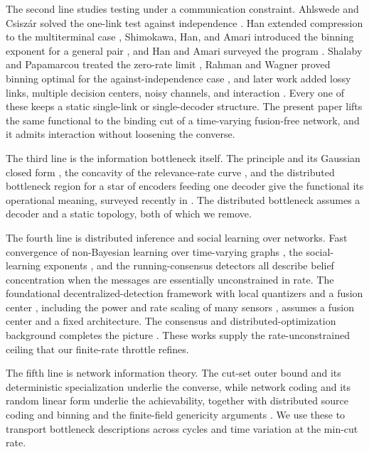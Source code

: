 \documentclass[journal]{IEEEtran}
\theoremstyle{definition}
\theoremstyle{remark}
\begin{document}
The second line studies testing under a communication constraint. Ahlswede and Csisz\'ar solved the one-link
test against independence \cite{ahlswedecsiszar1986}. Han extended compression to the multiterminal case
\cite{han1987}, Shimokawa, Han, and Amari introduced the binning exponent for a general pair \cite{sha1994}, and
Han and Amari surveyed the program \cite{hanamari1998}. Shalaby and Papamarcou treated the zero-rate limit
\cite{shalaby1992}, Rahman and Wagner proved binning optimal for the against-independence case
\cite{rahmanwagner2012}, and later work added lossy links, multiple decision centers, noisy channels, and
interaction \cite{katz2017,salehkalaibar2018,sreekumar2020,xiangkim2013,tianchen2008}. Every one of these keeps a
static single-link or single-decoder structure. The present paper lifts the same functional to the binding cut of
a time-varying fusion-free network, and it admits interaction without loosening the converse.

The third line is the information bottleneck itself. The principle and its Gaussian closed form
\cite{tishby1999,chechik2005}, the concavity of the relevance-rate curve \cite{giladbachrach2003}, and the
distributed bottleneck region for a star of encoders feeding one decoder \cite{aguerrizaidi2018,aguerrizaidi2021}
give the functional its operational meaning, surveyed recently in \cite{goldfeld2020,zaidi2020}. The distributed
bottleneck assumes a decoder and a static topology, both of which we remove.

The fourth line is distributed inference and social learning over networks. Fast convergence of non-Bayesian
learning over time-varying graphs \cite{nou2017}, the social-learning exponents
\cite{lalitha2018,shahrampour2016,jadbabaie2012,molavi2018}, and the running-consensus detectors
\cite{bajovic2011,braca2010,karmoura2012} all describe belief concentration when the messages are essentially
unconstrained in rate. The foundational decentralized-detection framework with local quantizers and a fusion
center \cite{tsitsiklis1988,tsitsiklis1993,tenneysandell1981,tsitsiklisathans1985,viswanathan1997},
including the power and rate scaling of many sensors \cite{chamberland2003,chamberland2004}, assumes a fusion
center and a fixed architecture. The consensus and distributed-optimization background completes the picture
\cite{olfatisaber2007,nedicozdaglar2009,nedicolshevsky2015,tbaa1986}. These works supply the rate-unconstrained
ceiling that our finite-rate throttle refines.

The fifth line is network information theory. The cut-set outer bound and its deterministic specialization
\cite{coverthomas2006,coverelgamal1979,elgamalkim2011} underlie the converse, while network coding and its
random linear form \cite{aclY2000,liyeungcai2003,koettermedard2003,ho2006,jaggi2005} underlie the achievability,
together with distributed source coding and binning \cite{slepianwolf1973,wynerziv1976,berger1978} and the
finite-field genericity arguments \cite{schwartz1980,zippel1979,kangulukus2011}. We use these to transport
bottleneck descriptions across cycles and time variation at the min-cut rate.
\end{document}
